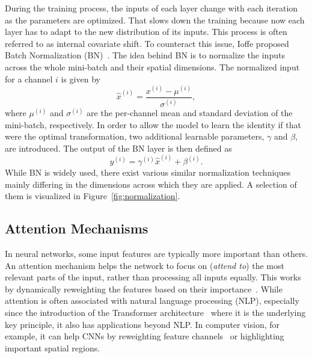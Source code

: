 During the training process, the inputs of each layer change with each iteration as the parameters are optimized.
That slows down the training because now each layer has to adapt to the new distribution of its inputs. This process is
often referred to as internal covariate shift.
To counteract this issue, Ioffe \etal proposed Batch Normalization (BN)~\cite{BatchNorm}.
The idea behind BN is to normalize the inputs across the whole mini-batch and their spatial dimensions.
The normalized input for a channel $i$ is given by
\begin{equation}
    \hat{x}^{(i)} = \frac{x^{(i)} - \mu^{(i)}}{\sigma^{(i)}},
\end{equation} 
where $\mu^{(i)}$ and $\sigma^{(i)}$ are the per-channel mean and standard deviation of the mini-batch, respectively.  
In order to allow the model to learn the identity if that were the optimal transformation, two additional learnable
parameters, $\gamma$ and $\beta$, are introduced. The output of the BN layer is then defined as
\begin{equation}
    y^{(i)} = \gamma^{(i)}\hat{x}^{(i)} + \beta^{(i)}.
\end{equation}
While BN is widely used, there exist various similar normalization techniques~\cite{LayerNorm, InstanceNorm, GroupNorm}
mainly differing in the dimensions across which they are applied.
A selection of them is visualized in Figure~\ref{fig:normalization}.


\subsection{Attention Mechanisms}

In neural networks, some input features are typically more important than others.
An attention mechanism helps the network to focus on (\textit{attend to}) the most relevant parts of the
input, rather than processing all inputs equally.
This works by dynamically reweighting the features based on their importance~\cite{Attention}.
While attention is often associated with natural language processing (NLP), especially since the introduction of the
Transformer architecture~\cite{Transformer} where it is the underlying key principle, it also has applications beyond
NLP.\@
In computer vision, for example, it can help CNNs by reweighting feature channels~\cite{SqueezeExcite} or
highlighting important spatial regions.
